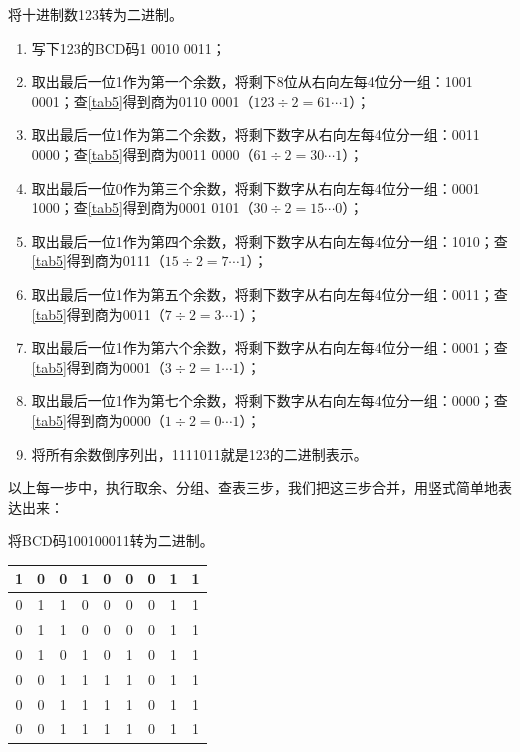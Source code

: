 \begin{example}\label{exa2}
将十进制数123转为二进制。
\begin{enumerate}
\item 写下123的BCD码1 0010 0011；
\item 取出最后一位1作为第一个余数，将剩下8位从右向左每4位分一组：1001 0001；查\autoref{tab5}得到商为0110 0001（$123\div 2=61\cdots 1$）；
\item 取出最后一位1作为第二个余数，将剩下数字从右向左每4位分一组：0011 0000；查\autoref{tab5}得到商为0011 0000（$61\div 2=30\cdots 1$）；
\item 取出最后一位0作为第三个余数，将剩下数字从右向左每4位分一组：0001 1000；查\autoref{tab5}得到商为0001 0101（$30\div 2=15\cdots 0$）；
\item 取出最后一位1作为第四个余数，将剩下数字从右向左每4位分一组：1010；查\autoref{tab5}得到商为0111（$15\div 2=7\cdots 1$）；
\item 取出最后一位1作为第五个余数，将剩下数字从右向左每4位分一组：0011；查\autoref{tab5}得到商为0011（$7\div 2=3\cdots 1$）；
\item 取出最后一位1作为第六个余数，将剩下数字从右向左每4位分一组：0001；查\autoref{tab5}得到商为0001（$3\div 2=1\cdots 1$）；
\item 取出最后一位1作为第七个余数，将剩下数字从右向左每4位分一组：0000；查\autoref{tab5}得到商为0000（$1\div 2=0\cdots 1$）；
\item 将所有余数倒序列出，1111011就是123的二进制表示。
\end{enumerate}
\end{example}

以上每一步中，执行取余、分组、查表三步，我们把这三步合并，用竖式简单地表达出来：
\begin{example}\label{exa1}
将BCD码100100011转为二进制。
\begin{center}
\begin{tabular}{|ccccccccc|}
\hline
1&0&0&1&\multicolumn{1}{|c}{0}&0&0&1&\multicolumn{1}{|c|}{1}\\\hline
0&1&1&\multicolumn{1}{|c}{0}&0&0&0&\multicolumn{1}{|c}{1}&1\\\hline
0&1&\multicolumn{1}{|c}{1}&0&0&0&\multicolumn{1}{|c}{0}&1&1\\\hline
0&\multicolumn{1}{|c}{1}&0&1&0&\multicolumn{1}{|c}{1}&0&1&1\\\hline
0&0&1&1&\multicolumn{1}{|c}{1}&1&0&1&1\\\hline
0&0&1&\multicolumn{1}{|c}{1}&1&1&0&1&1\\\hline
0&0&\multicolumn{1}{|c}{1}&1&1&1&0&1&1\\\hline
\end{tabular}
\end{center}
\end{example}

